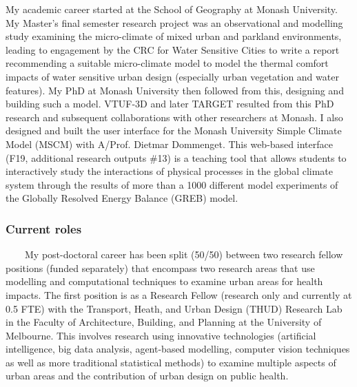 My academic career started at the School of Geography at Monash University. My Master's final semester research project was an observational and modelling study examining the micro-climate of mixed urban and parkland environments, leading to engagement by the CRC for Water Sensitive Cities to write a report recommending a suitable micro-climate model to model the thermal comfort impacts of water sensitive urban design (especially urban vegetation and water features). My PhD at Monash University then followed from this, designing and building such a model. VTUF-3D and later TARGET resulted from this PhD research and subsequent collaborations with other researchers at Monash. I also designed and built the user interface for the Monash University Simple Climate Model (MSCM) with A/Prof. Dietmar Dommenget. This web-based interface (F19, additional research outputs \#13) is a teaching tool that allows students to interactively study the interactions of physical processes in the global climate system through the results of more than a 1000 different model experiments of the Globally Resolved Energy Balance (GREB) model.



\subsubsection*{\textbf{Current roles}}


~~~~My post-doctoral career has been split (50/50) between two research fellow positions (funded separately) that encompass two research areas that use modelling and computational techniques to examine urban areas for health impacts. The first position is as a Research Fellow (research only and currently at 0.5 FTE)  with the Transport, Heath, and Urban Design (THUD) Research Lab in the Faculty of Architecture, Building, and Planning at the University of Melbourne. This involves research using innovative technologies (artificial intelligence, big data analysis, agent-based modelling, computer vision techniques as well as more traditional statistical methods) to examine multiple aspects of urban areas and the contribution of urban design on public health. 

